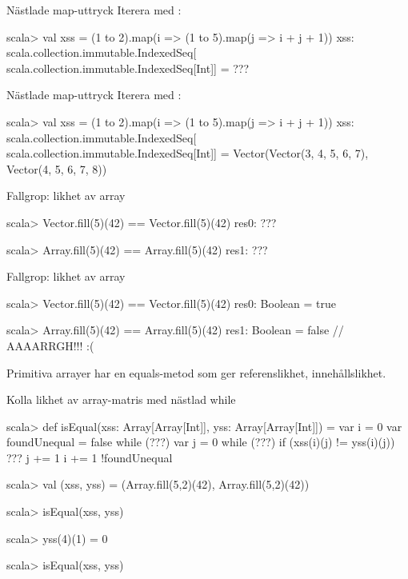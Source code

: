\begin{Slide}{Nästlade map-uttryck}\SlideFontSmall
Iterera med :\\
\begin{REPL}
scala> val xss = (1 to 2).map(i => (1 to 5).map(j => i + j + 1))
xss:
  scala.collection.immutable.IndexedSeq[
    scala.collection.immutable.IndexedSeq[Int]] =
      ???
\end{REPL}
\end{Slide}

\begin{Slide}{Nästlade map-uttryck}\SlideFontSmall
Iterera med :\\
\begin{REPL}
scala> val xss = (1 to 2).map(i => (1 to 5).map(j => i + j + 1))
xss:
  scala.collection.immutable.IndexedSeq[
    scala.collection.immutable.IndexedSeq[Int]] =
      Vector(Vector(3, 4, 5, 6, 7), Vector(4, 5, 6, 7, 8))
\end{REPL}
\end{Slide}



\ifkompendium\else
\begin{Slide}{Fallgrop: likhet av array}
\begin{REPL}
scala> Vector.fill(5)(42) == Vector.fill(5)(42)
res0: ???

scala> Array.fill(5)(42) == Array.fill(5)(42)
res1: ???
\end{REPL}
\end{Slide}
\fi

\begin{Slide}{Fallgrop: likhet av array}
\begin{REPL}
scala> Vector.fill(5)(42) == Vector.fill(5)(42)
res0: Boolean = true

scala> Array.fill(5)(42) == Array.fill(5)(42)
res1: Boolean = false  // AAAARRGH!!! :(
\end{REPL}
Primitiva arrayer har en equals-metod som ger referenslikhet,  innehållslikhet.
\end{Slide}

\ifkompendium\else
\begin{Slide}{Kolla likhet av array-matris med nästlad while}
\begin{REPL}
scala> def isEqual(xss: Array[Array[Int]], yss: Array[Array[Int]]) = {
         var i = 0
         var foundUnequal = false
         while (???) {
           var j = 0
           while (???) {
             if (xss(i)(j) != yss(i)(j)) ???
             j += 1
           }
           i += 1
         }
         !foundUnequal
       }

scala> val (xss, yss) = (Array.fill(5,2)(42), Array.fill(5,2)(42))

scala> isEqual(xss, yss)

scala> yss(4)(1) = 0

scala> isEqual(xss, yss)
\end{REPL}
\end{Slide}
\fi


